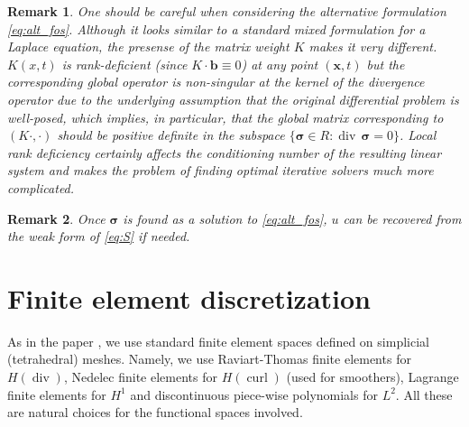 \documentclass[a4paper,12pt]{amsart}
\numberwithin{equation}{section}
\newtheorem{remark}{Remark}[section]
\newcommand{\curl}{\operatorname{curl}}
\renewcommand{\div}{\operatorname{div}}
\def\bb{{\mathbf b}}
\def\XVec#1{{\mathbf #1}}
\def\Xx{\XVec{x}}
\def\bsigma{{\boldsymbol \sigma}}
\begin{document}
\begin{remark}
One should be careful when considering the alternative formulation \eqref{eq:alt_fos}. Although it looks similar to a standard mixed formulation for a Laplace equation, the presense of the matrix weight $K$ makes it very different. $K(x,t)$ is rank-deficient (since $K \cdot \bb \equiv 0$) at any point $(\Xx,t)$ but the corresponding global operator is non-singular at the kernel of the divergence operator due to the underlying assumption that the original differential problem is well-posed, which implies, in particular, that the global matrix corresponding to $(K\cdot,\cdot)$ should  be positive definite in the subspace $\{\bsigma \in R : \div \, \bsigma = 0\}$. Local rank deficiency certainly affects the conditioning number of the resulting linear system and makes the problem of finding optimal iterative solvers much more complicated.
\end{remark}

\begin{remark}
Once $\bsigma$ is found as a solution to \eqref{eq:alt_fos}, $u$ can be recovered from the weak form of \eqref{eq:S} if needed.
\end{remark}

\section{Finite element discretization}

As in the paper \cite{our_cfosls_paper}, we use standard finite element spaces defined on simplicial (tetrahedral) meshes. Namely, we use Raviart-Thomas finite elements for $H(\div)$, Nedelec finite elements for $H(\curl)$ (used for smoothers), Lagrange finite elements for $H^1$ and discontinuous piece-wise polynomials for $L^2$. All these are natural choices for the functional spaces involved.
\end{document}
